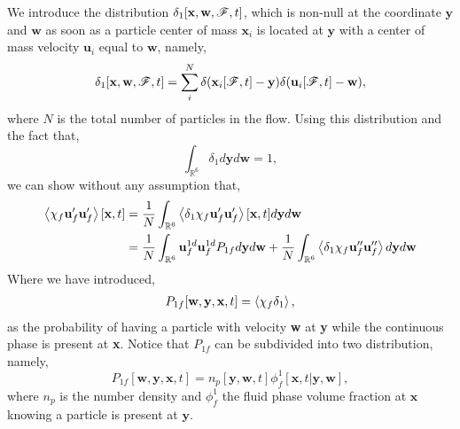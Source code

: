 We introduce the distribution $\delta_1[\textbf{x},\textbf{w},\mathscr{F},t]$, which is non-null at the coordinate $\textbf{y}$ and $\textbf{w}$ as soon as a particle center of mass $\textbf{x}_i$ is located at $\textbf{y}$ with a center of mass velocity $\textbf{u}_i$ equal to $\textbf{w}$, namely, 
\begin{equation*}
    \delta_1[\textbf{x},\textbf{w},\mathscr{F},t] =\sum_i^N \delta(\textbf{x}_i[\mathscr{F},t] - \textbf{y})\delta(\textbf{u}_i[\mathscr{F},t] - \textbf{w}),
\end{equation*}
where $N$ is the total number of particles in the flow. 
Using this distribution and the fact that, 
\begin{equation*}
    \int_{\mathbb{R}^6}
    \delta_1
    d \textbf{y}
    d \textbf{w}
    = 1,
\end{equation*}
we can show without any assumption that, 
\begin{align}
    \avg{\chi_f \textbf{u}_f' \textbf{u}_f'}[\textbf{x},t]
    &= \frac{1}{N}
    \int_{\mathbb{R}^6}
    \avg{\delta_1\chi_f \textbf{u}_f' \textbf{u}_f'}[\textbf{x},t]
    d\textbf{y}
    d\textbf{w}\\
    &= 
    \frac{1}{N}
    \int_{\mathbb{R}^6}
    \textbf{u}_f^{1d}
    \textbf{u}_f^{1d}
    P_{1f}
    d\textbf{y}
    d\textbf{w}
    + 
    \frac{1}{N}
    \int_{\mathbb{R}^6}
    \avg{\delta_1 \chi_f\textbf{u}_f'' \textbf{u}_f''}
    d\textbf{y}
    d\textbf{w}
    \label{eq:classic_avg}
\end{align}
Where we have introduced,  
\begin{align}
    P_{1f} [\textbf{w},\textbf{y},\textbf{x},t]
    =
    \left<\chi_f \delta_1\right>,
\end{align}
as the probability of having a particle with velocity \textbf{w} at \textbf{y} while the continuous phase is present at \textbf{x}.
Notice that $P_{1f}$ can be subdivided into two distribution, namely, 
\begin{equation}
    P_{1f} [\textbf{w},\textbf{y},\textbf{x},t]
    = n_p[\textbf{y},\textbf{w},t] \phi_f^1[\textbf{x},t|\textbf{y},\textbf{w}],
\end{equation}
where $n_p$ is the number density and $\phi_f^1$ the fluid phase volume fraction at $\textbf{x}$ knowing a particle is present at $\textbf{y}$. 
